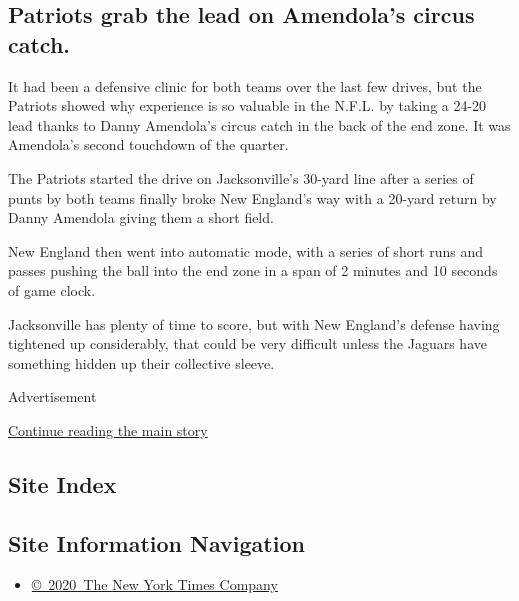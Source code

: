 \hypertarget{patriots-grab-the-lead-on-amendolas-circus-catch}{%
\subsection{Patriots grab the lead on Amendola's circus
catch.}\label{patriots-grab-the-lead-on-amendolas-circus-catch}}

It had been a defensive clinic for both teams over the last few drives,
but the Patriots showed why experience is so valuable in the N.F.L. by
taking a 24-20 lead thanks to Danny Amendola's circus catch in the back
of the end zone. It was Amendola's second touchdown of the quarter.

The Patriots started the drive on Jacksonville's 30-yard line after a
series of punts by both teams finally broke New England's way with a
20-yard return by Danny Amendola giving them a short field.

New England then went into automatic mode, with a series of short runs
and passes pushing the ball into the end zone in a span of 2 minutes and
10 seconds of game clock.

Jacksonville has plenty of time to score, but with New England's defense
having tightened up considerably, that could be very difficult unless
the Jaguars have something hidden up their collective sleeve.

Advertisement

\protect\hyperlink{after-bottom}{Continue reading the main story}

\hypertarget{site-index}{%
\subsection{Site Index}\label{site-index}}

\hypertarget{site-information-navigation}{%
\subsection{Site Information
Navigation}\label{site-information-navigation}}

\begin{itemize}
\tightlist
\item
  \href{https://help.nytimes3xbfgragh.onion/hc/en-us/articles/115014792127-Copyright-notice}{©~2020~The
  New York Times Company}
\end{itemize}

